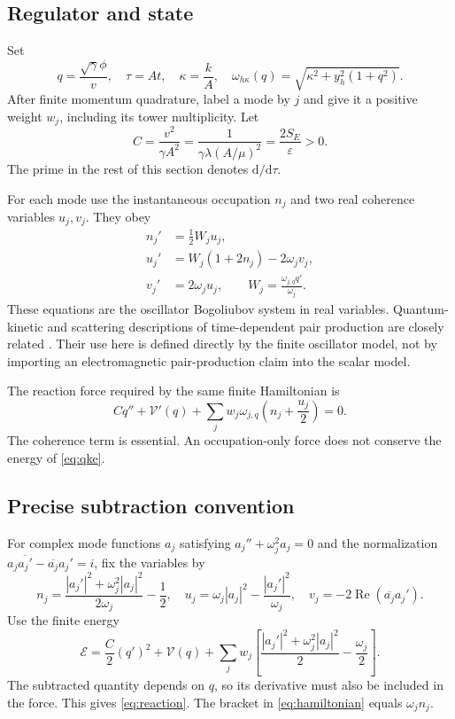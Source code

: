 \documentclass[11pt]{article}
\theoremstyle{definition}\newtheorem{definition}[theorem]{Definition}
\newcommand{\dd}{\mathrm d}\newcommand{\eps}{\varepsilon}
\begin{document}
\subsection{Regulator and state}
Set
\begin{equation}
 q=\frac{\sqrt\gamma\phi}{v},\quad \tau=At,\quad
 \kappa=\frac{k}{A},\quad
 \omega_{h\kappa}(q)=\sqrt{\kappa^2+y_h^2(1+q^2)}.
\end{equation}
After finite momentum quadrature, label a mode by $j$ and give it a positive weight $w_j$, including its tower multiplicity. Let
\begin{equation}
 C=\frac{v^2}{\gamma A^2}
 =\frac{1}{\gamma\lambda(A/\mu)^2}
 =\frac{2S_E}{\eps}>0.
\end{equation}
The prime in the rest of this section denotes $\dd/\dd\tau$.

For each mode use the instantaneous occupation $n_j$ and two real coherence variables $u_j,v_j$. They obey
\begin{align}
 n_j'&=\frac12 W_j u_j,\\
 u_j'&=W_j(1+2n_j)-2\omega_j v_j,\\
 v_j'&=2\omega_j u_j,\qquad
 W_j=\frac{\omega_{j,q}q'}{\omega_j}.
 \label{eq:qke}
\end{align}
These equations are the oscillator Bogoliubov system in real variables. Quantum-kinetic and scattering descriptions of time-dependent pair production are closely related \cite{qke}. Their use here is defined directly by the finite oscillator model, not by importing an electromagnetic pair-production claim into the scalar model.

The reaction force required by the same finite Hamiltonian is
\begin{equation}
 \boxed{Cq''+\mathcal V'(q)
 +\sum_j w_j\omega_{j,q}\left(n_j+\frac{u_j}{2}\right)=0.}
 \label{eq:reaction}
\end{equation}
The coherence term is essential. An occupation-only force does not conserve the energy of \eqref{eq:qke}.

\subsection{Precise subtraction convention}
For complex mode functions $a_j$ satisfying $a_j''+\omega_j^2a_j=0$ and the normalization $a_j\overline{a_j'}-\overline{a_j}a_j'=i$, fix the variables by
\begin{equation}
 n_j=\frac{|a_j'|^2+\omega_j^2|a_j|^2}{2\omega_j}-\frac12,
 \quad u_j=\omega_j|a_j|^2-\frac{|a_j'|^2}{\omega_j},
 \quad v_j=-2\operatorname{Re}(\overline{a_j}a_j').
\end{equation}
Use the finite energy
\begin{equation}
 \mathcal E=\frac C2(q')^2+\mathcal V(q)
 +\sum_jw_j\left[\frac{|a_j'|^2+\omega_j^2|a_j|^2}{2}
 -\frac{\omega_j}{2}\right].
 \label{eq:hamiltonian}
\end{equation}
The subtracted quantity depends on $q$, so its derivative must also be included in the force. This gives \eqref{eq:reaction}. The bracket in \eqref{eq:hamiltonian} equals $\omega_jn_j$.
\end{document}
